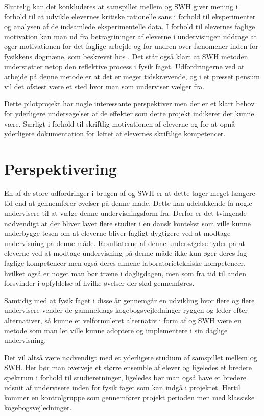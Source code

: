 Sluttelig kan det konkluderes at samspillet mellem \ib{} og SWH giver mening i forhold til at udvikle elevernes kritiske rationelle sans i forhold til eksperimenter og analysen af de indsamlede eksperimentelle data. I forhold til elevernes faglige motivation kan man ud fra betragtininger af eleverne i undervisingen uddrage at \ib{} øger motivationen for det faglige arbejde og for undren over fænomener inden for fysikkens dogmæne, som beskrevet hos \citet{Dolin2014}. Det står også klart at SWH metoden understøtter netop den reflektive process i fysik faget. Udfordringerne ved at arbejde på denne metode er at det er meget tidskrævende, og i et presset pensum vil det ofstest være et sted hvor man som underviser vælger fra. 

Dette pilotprojekt har nogle interessante perspektiver men der er et klart behov for yderligere undersøgelser af de effekter som dette projekt indikerer der kunne være. Særligt i forhold til skriftlig motivationen af eleverne og for at opnå yderligere dokumentation for løftet af elevernes skriftlige kompetencer. 


\section{Perspektivering}
\label{sec:per}

En af de store udfordringer i brugen af \ib{} og SWH er at dette tager meget længere tid end at gennemfører øvelser på denne måde. Dette kan udelukkende få nogle undervisere til at vælge denne undervisningsform fra. Derfor er det tvingende nødvendigt at der bliver lavet flere studier i en dansk kontekst som ville kunne underbygge tesen om at eleverne bliver fagligt dygtigere ved at modtage undervisning på denne måde. Resultaterne af denne undersøgelse tyder på at eleverne ved at modtage undervisning på denne måde ikke kun øger deres fag faglige kompetencer men også deres almene laboratorietekniske kompetencer, hvilket også er noget man bør træne i dagligdagen, men som fra tid til anden forsvinder i opfyldelse af hvilke øvelser der skal gennemføres.

Samtidig med at fysik faget i disse år gennemgår en udvikling hvor flere og flere undervisere vender de gammeldags kogebogsvejledninger ryggen og leder efter alternativer,  så kunne et velformuleret alternativ i form af \ib{} og SWH være en metode som man let ville kunne adoptere og implementere i sin daglige undervisning. 

Det vil altså være nødvendigt med et yderligere studium af samspillet mellem \ib{} og SWH. Her bør man overveje et større ensemble af elever og ligeledes et bredere spektrum i forhold til studieretninger, ligeledes bør man også have et bredere udsnit af undervisere inden for fysik faget som kan indgå i projektet. Hertil kommer en kontrolgruppe som gennemfører projekt perioden men med klassiske kogebogsvejledninger.



